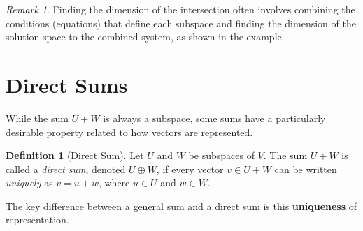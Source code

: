 \documentclass[11pt]{article}
\theoremstyle{plain}
\theoremstyle{definition}
\newtheorem{definition}[theorem]{Definition}
\theoremstyle{remark}
\newtheorem{remark}[theorem]{Remark}
\begin{document}
\begin{remark}
Finding the dimension of the intersection often involves combining the conditions (equations) that define each subspace and finding the dimension of the solution space to the combined system, as shown in the example.
\end{remark}

\section{Direct Sums}

While the sum $U+W$ is always a subspace, some sums have a particularly desirable property related to how vectors are represented.

\begin{definition}[Direct Sum]
Let $U$ and $W$ be subspaces of $V$. The sum $U+W$ is called a \emph{direct sum}, denoted $U \oplus W$, if every vector $v \in U+W$ can be written \emph{uniquely} as $v = u + w$, where $u \in U$ and $w \in W$.
\end{definition}

The key difference between a general sum and a direct sum is this \textbf{uniqueness} of representation.
\end{document}
